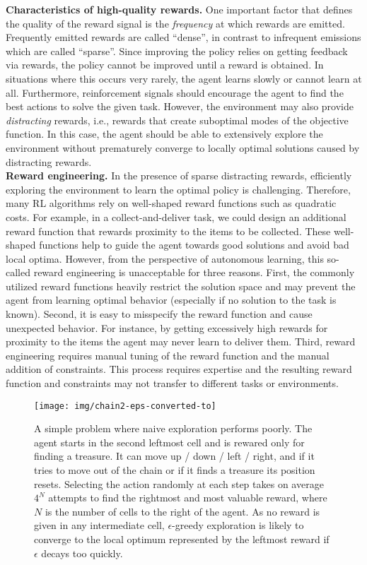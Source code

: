 \documentclass{article}
\begin{document}
\noindent\textbf{Characteristics of high-quality rewards.} 
One important factor that defines the quality of the reward signal is the \textit{frequency} at which rewards are emitted. Frequently emitted rewards are called ``dense'', in contrast to infrequent emissions which are called ``sparse''. Since improving the policy relies on getting feedback via rewards, the policy cannot be improved until a reward is obtained. In situations where this occurs very rarely, the agent learns slowly or cannot learn at all. 
Furthermore, reinforcement signals should encourage the agent to find the best actions to solve the given task. However, the environment may also provide \textit{distracting} rewards, i.e., rewards that create suboptimal modes of the objective function. In this case, the agent should be able to extensively explore the environment without prematurely converge to locally optimal solutions caused by distracting rewards.
\\[5pt]
\textbf{Reward engineering.}
In the presence of sparse distracting rewards, efficiently exploring the environment to learn the optimal policy is challenging.
Therefore, many RL algorithms rely on well-shaped reward functions such as quadratic costs.
For example, in a collect-and-deliver task, we could design an additional reward function that rewards proximity to the items to be collected.
These well-shaped functions help to guide the agent towards good solutions and avoid bad local optima. 
However, from the perspective of autonomous learning, this so-called reward engineering is unacceptable for three reasons.
First, the commonly utilized reward functions heavily restrict the solution space and may prevent the agent from learning optimal behavior (especially if no solution to the task is known). 
Second, it is easy to misspecify the reward function and cause unexpected behavior. For instance, by getting excessively high rewards for proximity to the items the agent may never learn to deliver them.
Third, reward engineering requires manual tuning of the reward function and the manual addition of constraints. This process requires expertise and the resulting reward function and constraints may not transfer to different tasks or environments. 


\begin{figure}[t]
	\centering
	\texttt{[image: img/chain2-eps-converted-to]}
	\caption{\label{fig:chain}A simple problem where naive exploration performs poorly. The agent starts in the second leftmost cell and is rewared only for finding a treasure. It can move up / down / left / right, and if it tries to move out of the chain or if it finds a treasure its position resets. 
	Selecting the action randomly at each step takes on average $4^N$ attempts to find the rightmost and most valuable reward, where $N$ is the number of cells to the right of the agent.
	As no reward is given in any intermediate cell, $\epsilon$-greedy exploration 
is likely to converge to the local optimum represented by the leftmost reward if $\epsilon$ decays too quickly.}
\end{figure}
\end{document}
